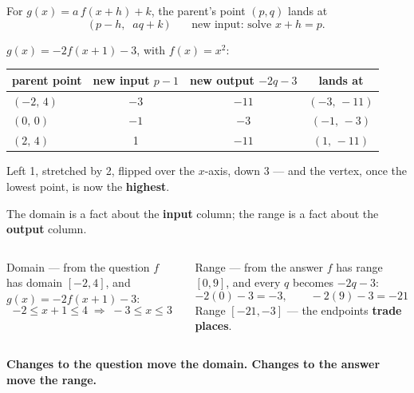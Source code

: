 \documentclass[aspectratio=169, 11pt]{beamer}
\begin{document}
\begin{frame}[t, plain]

  \begin{block}{For \(g(x) = a\,f(x+h) + k\), the parent's point \((p, q)\) lands at}
    \[
      \bigl(\,p - h,\;\; aq + k\,\bigr)
      \qquad\text{new input: solve } x + h = p.
    \]
  \end{block}

  \medskip
  \(g(x) = -2f(x+1) - 3\), with \(f(x) = x^2\):

  \smallskip
  \begin{center}
  \renewcommand{\arraystretch}{1.35}
  \begin{tabular}{|l|c|c|c|}
  \hline
  \textbf{parent point} & \textbf{new input} \(p - 1\) & \textbf{new output} \(-2q - 3\) & \textbf{lands at} \\
  \hline
  \((-2,\,4)\) & \(-3\) & \(-11\) & \((-3,\,-11)\) \\
  \hline
  \((0,\,0)\) & \(-1\) & \(-3\) & \((-1,\,-3)\) \\
  \hline
  \((2,\,4)\) & 1 & \(-11\) & \((1,\,-11)\) \\
  \hline
  \end{tabular}
  \end{center}

  \medskip
  Left 1, stretched by 2, flipped over the \(x\)-axis, down 3 --- and the
  vertex, once the lowest point, is now the \textbf{highest}.
\end{frame}

\begin{frame}[t, plain]

  The domain is a fact about the \textbf{input} column; the range is a fact
  about the \textbf{output} column.

  \medskip
  \begin{columns}[T, onlytextwidth]
      \begin{block}{Domain --- from the question}
        \(f\) has domain \([-2, 4]\), and \(g(x) = -2f(x+1) - 3\):
        \[ -2 \le x + 1 \le 4 \;\Longrightarrow\; -3 \le x \le 3 \]
      \end{block}

      \begin{block}{Range --- from the answer}
        \(f\) has range \([0, 9]\), and every \(q\) becomes \(-2q - 3\):
        \[ -2(0) - 3 = -3, \qquad -2(9) - 3 = -21 \]
        Range \([-21, -3]\) --- the endpoints \textbf{trade places}.
      \end{block}
  \end{columns}

  \medskip
  \begin{center}
    \textbf{Changes to the question move the domain. Changes to the answer
    move the range.}
  \end{center}
\end{frame}
\end{document}
